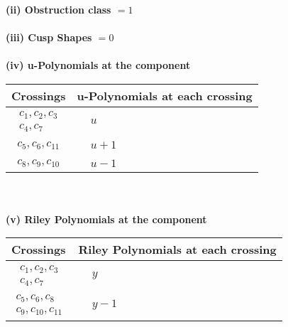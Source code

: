 \documentclass[1p]{elsarticle_modified}
\theoremstyle{definition}
\begin{document}
\flushleft \textbf{(ii) Obstruction class $= 1$}\\~\\
\flushleft \textbf{(iii) Cusp Shapes $= 0$}\\~\\
\newpage\renewcommand{\arraystretch}{1}
\flushleft \textbf{(iv) u-Polynomials at the component}\newline \\
\begin{tabular}{m{50pt}|m{274pt}}
Crossings & \hspace{64pt}u-Polynomials at each crossing \\
\hline $$\begin{aligned}c_{1},c_{2},c_{3}\\c_{4},c_{7}\end{aligned}$$&$\begin{aligned}
&u
\end{aligned}$\\
\hline $$\begin{aligned}c_{5},c_{6},c_{11}\end{aligned}$$&$\begin{aligned}
&u+1
\end{aligned}$\\
\hline $$\begin{aligned}c_{8},c_{9},c_{10}\end{aligned}$$&$\begin{aligned}
&u-1
\end{aligned}$\\
\hline
\end{tabular}\\~\\
\newpage\renewcommand{\arraystretch}{1}
\flushleft \textbf{(v) Riley Polynomials at the component}\newline \\
\begin{tabular}{m{50pt}|m{274pt}}
Crossings & \hspace{64pt}Riley Polynomials at each crossing \\
\hline $$\begin{aligned}c_{1},c_{2},c_{3}\\c_{4},c_{7}\end{aligned}$$&$\begin{aligned}
&y
\end{aligned}$\\
\hline $$\begin{aligned}c_{5},c_{6},c_{8}\\c_{9},c_{10},c_{11}\end{aligned}$$&$\begin{aligned}
&y-1
\end{aligned}$\\
\hline
\end{tabular}\\~\\
\end{document}
